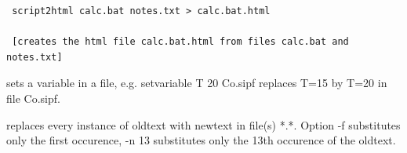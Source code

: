 \begin{description}
\begin{verbatim}
 script2html calc.bat notes.txt > calc.bat.html

 [creates the html file calc.bat.html from files calc.bat and notes.txt]
\end{verbatim}
\item [\prg setvariable\index{setvariable}\label{setvariable} varname value *.*:]
sets a variable in a file, e.g. {\prg setvariable T 20 Co.sipf} replaces
T=15 by T=20 in file {\prg Co.sipf}.
\item [\prg substitute\index{substitute} {[option]} oldtext newtext *.*:] replaces every instance of %
oldtext with newtext in file(s) *.*. Option {\prg -f} substitutes only the first occurence, 
{\prg -n 13} substitutes only the 13th occurence of the oldtext.
\end{description}


